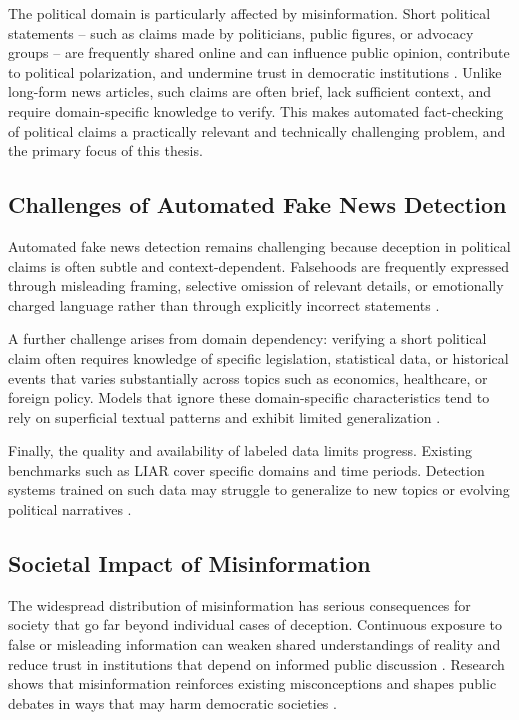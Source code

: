 The political domain is particularly affected by misinformation. Short political statements -- such as claims made by politicians, public figures, or advocacy groups -- are frequently shared online and can influence public opinion, contribute to political polarization, and undermine trust in democratic institutions \cite{Lazer_2018}. Unlike long-form news articles, such claims are often brief, lack sufficient context, and require domain-specific knowledge to verify. This makes automated fact-checking of political claims a practically relevant and technically challenging problem, and the primary focus of this thesis.

\subsection{Challenges of Automated Fake News Detection}

Automated fake news detection remains challenging because deception in political claims is often subtle and context-dependent. Falsehoods are frequently expressed through misleading framing, selective omission of relevant details, or emotionally charged language rather than through explicitly incorrect statements \cite{10.1145/3728725.3728739}.

A further challenge arises from domain dependency: verifying a short political claim often requires knowledge of specific legislation, statistical data, or historical events that varies substantially across topics such as economics, healthcare, or foreign policy. Models that ignore these domain-specific characteristics tend to rely on superficial textual patterns and exhibit limited generalization \cite{HAMED2023e20382}.

Finally, the quality and availability of labeled data limits progress. Existing benchmarks such as LIAR cover specific domains and time periods. Detection systems trained on such data may struggle to generalize to new topics or evolving political narratives \cite{wang2017liarliarpantsfire}.

\subsection{Societal Impact of Misinformation}

The widespread distribution of misinformation has serious consequences for society that go far beyond individual cases of deception. Continuous exposure to false or misleading information can weaken shared understandings of reality and reduce trust in institutions that depend on informed public discussion \cite{iizuka-2022}. Research shows that misinformation reinforces existing 
misconceptions and shapes public debates in ways that may harm democratic societies \cite{Lazer_2018}.

